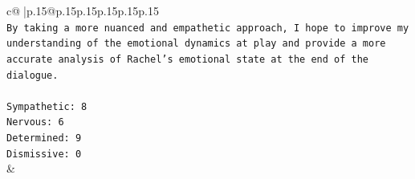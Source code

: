 \documentclass{article}
\begin{document}
{\begin{supertabular}{c@{$\;$}|p{.15\linewidth}@{}p{.15\linewidth}p{.15\linewidth}p{.15\linewidth}p{.15\linewidth}p{.15\linewidth}}
{{{\\ 
\texttt{By taking a more nuanced and empathetic approach, I hope to improve my understanding of the emotional dynamics at play and provide a more accurate analysis of Rachel's emotional state at the end of the dialogue.} \\
\\ 
\texttt{Sympathetic: 8} \\
\texttt{Nervous: 6} \\
\texttt{Determined: 9} \\
\texttt{Dismissive: 0} \\
            }
        }
    }
    & \\ \\

\end{supertabular}
}
\end{document}
